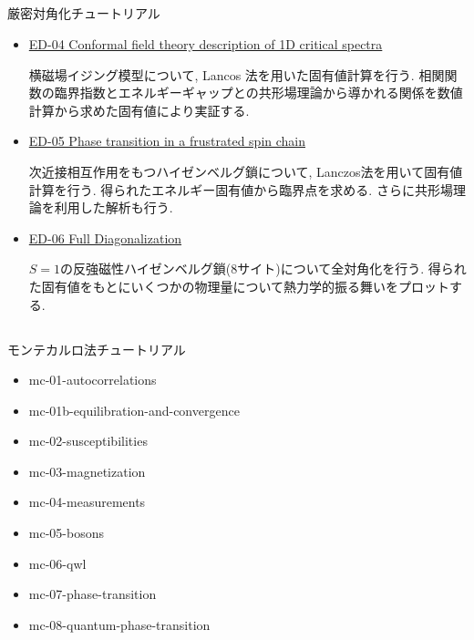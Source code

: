 \subsection*{\redm\whiteb\greenm}
\begin{frame}[t,fragile]{厳密対角化チュートリアル}
  \begin{itemize}
  \item \href{http://alps.comp-phys.org/mediawiki/index.php/ALPS_2_Tutorials:ED-04_Criticality/ja}{ED-04 Conformal field theory description of 1D critical spectra}

    横磁場イジング模型について, Lancos 法を用いた固有値計算を行う. 相関関数の臨界指数とエネルギーギャップとの共形場理論から導かれる関係を数値計算から求めた固有値により実証する.

  \item \href{http://alps.comp-phys.org/mediawiki/index.php/ALPS_2_Tutorials:ED-05_ED_Phase_Transition/ja}{ED-05 Phase transition in a frustrated spin chain}

    次近接相互作用をもつハイゼンベルグ鎖について, Lanczos法を用いて固有値計算を行う. 得られたエネルギー固有値から臨界点を求める. さらに共形場理論を利用した解析も行う.

  \item \href{http://alps.comp-phys.org/mediawiki/index.php/ALPS_2_Tutorials:ED-06_FullDiagonalization/ja}{ED-06 Full Diagonalization}

    $S=1$の反強磁性ハイゼンベルグ鎖(8サイト)について全対角化を行う. 得られた固有値をもとにいくつかの物理量について熱力学的振る舞いをプロットする.
  \end{itemize}
\end{frame}

\subsection*{\redm\whiteb\greenm}
\begin{frame}[t,fragile]{モンテカルロ法チュートリアル}
  \begin{itemize}
  \item mc-01-autocorrelations
  \item mc-01b-equilibration-and-convergence
  \item mc-02-susceptibilities
  \item mc-03-magnetization
  \item mc-04-measurements
  \item mc-05-bosons
  \item mc-06-qwl
  \item mc-07-phase-transition
  \item mc-08-quantum-phase-transition
  \end{itemize}
\end{frame}


